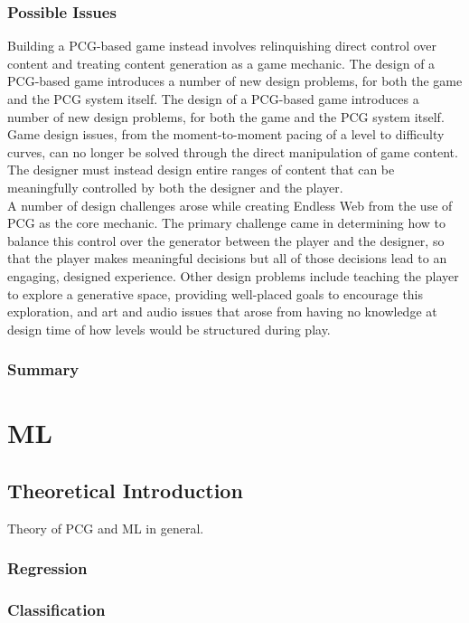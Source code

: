\documentclass[MGS,Master,english]{twbook}%
\begin{document}
\subsection{Possible Issues}
Building a PCG-based game instead involves relinquishing direct control over content and treating content generation as a game mechanic. The design of a PCG-based game introduces a number of new design problems, for both the game and the PCG system itself. The design of a PCG-based game introduces a number of new design problems, for both the game and the PCG system itself. Game design issues, from the moment-to-moment pacing of a level to difficulty curves, can no longer be solved through the direct manipulation of game content. The designer must instead design entire ranges of content that can be meaningfully controlled by both the designer and the player. \cite{pcg::endlessWeb}\\
A number of design challenges arose while creating Endless Web from the use of PCG as the core mechanic. The primary challenge came in determining how to balance this control over the generator between the player and the designer, so that the player makes meaningful decisions but all of those decisions lead to an engaging, designed experience. Other design problems include teaching the player to explore a generative space, providing well-placed goals to encourage this exploration, and art and audio issues that arose from having no knowledge at design time of how levels would be structured during play.  \cite{pcg::endlessWeb}
\subsection{Summary}

%
%
\clearpage
\chapter{\acl{ML}}

\section{Theoretical Introduction}
Theory of PCG and ML in general.

\subsection{Regression}
\subsection{Classification}
\end{document}

